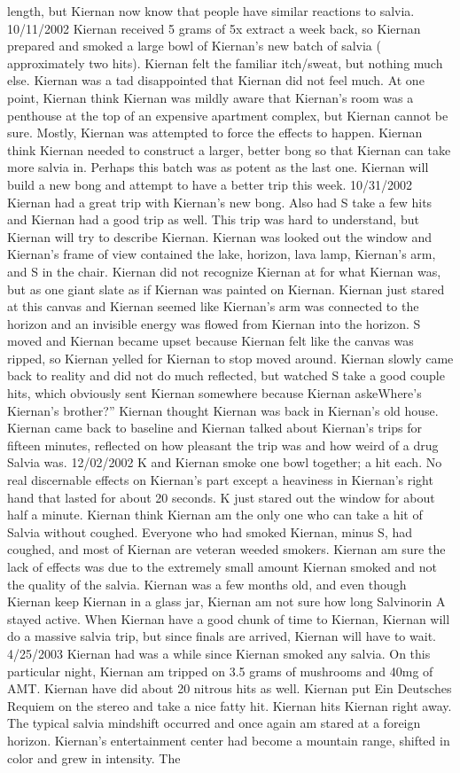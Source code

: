 \documentclass[12pt]{book}
\begin{document}
length, but Kiernan now know that people have similar reactions to salvia. 10/11/2002 Kiernan received 5 grams of 5x extract a week back, so Kiernan prepared and smoked a large bowl of Kiernan's new batch of salvia ( approximately two hits). Kiernan felt the familiar itch/sweat, but nothing much else. Kiernan was a tad disappointed that Kiernan did not feel much. At one point, Kiernan think Kiernan was mildly aware that Kiernan's room was a penthouse at the top of an expensive apartment complex, but Kiernan cannot be sure. Mostly, Kiernan was attempted to force the effects to happen. Kiernan think Kiernan needed to construct a larger, better bong so that Kiernan can take more salvia in. Perhaps this batch was as potent as the last one. Kiernan will build a new bong and attempt to have a better trip this week. 10/31/2002 Kiernan had a great trip with Kiernan's new bong. Also had S take a few hits and Kiernan had a good trip as well. This trip was hard to understand, but Kiernan will try to describe Kiernan. Kiernan was looked out the window and Kiernan's frame of view contained the lake, horizon, lava lamp, Kiernan's arm, and S in the chair. Kiernan did not recognize Kiernan at for what Kiernan was, but as one giant slate as if Kiernan was painted on Kiernan. Kiernan just stared at this canvas and Kiernan seemed like Kiernan's arm was connected to the horizon and an invisible energy was flowed from Kiernan into the horizon. S moved and Kiernan became upset because Kiernan felt like the canvas was ripped, so Kiernan yelled for Kiernan to stop moved around. Kiernan slowly came back to reality and did not do much reflected, but watched S take a good couple hits, which obviously sent Kiernan somewhere because Kiernan askeWhere's Kiernan's brother?'' Kiernan thought Kiernan was back in Kiernan's old house. Kiernan came back to baseline and Kiernan talked about Kiernan's trips for fifteen minutes, reflected on how pleasant the trip was and how weird of a drug Salvia was. 12/02/2002 K and Kiernan smoke one bowl together; a hit each. No real discernable effects on Kiernan's part except a heaviness in Kiernan's right hand that lasted for about 20 seconds. K just stared out the window for about half a minute. Kiernan think Kiernan am the only one who can take a hit of Salvia without coughed. Everyone who had smoked Kiernan, minus S, had coughed, and most of Kiernan are veteran weeded smokers. Kiernan am sure the lack of effects was due to the extremely small amount Kiernan smoked and not the quality of the salvia. Kiernan was a few months old, and even though Kiernan keep Kiernan in a glass jar, Kiernan am not sure how long Salvinorin A stayed active. When Kiernan have a good chunk of time to Kiernan, Kiernan will do a massive salvia trip, but since finals are arrived, Kiernan will have to wait. 4/25/2003 Kiernan had was a while since Kiernan smoked any salvia. On this particular night, Kiernan am tripped on 3.5 grams of mushrooms and 40mg of AMT. Kiernan have did about 20 nitrous hits as well. Kiernan put Ein Deutsches Requiem on the stereo and take a nice fatty hit. Kiernan hits Kiernan right away. The typical salvia mindshift occurred and once again am stared at a foreign horizon. Kiernan's entertainment center had become a mountain range, shifted in color and grew in intensity. The 
\end{document}
